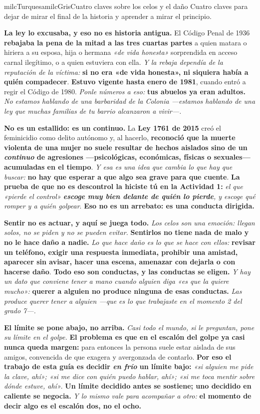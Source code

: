 \documentclass[11pt,letterpaper]{article}
\newcommand{\milcpaso}[3]{%
\Needspace{4\baselineskip}%
\begin{tcolorbox}[enhanced,colback=white,colframe=milcLinea,arc=1.5mm,boxrule=.9pt,
  left=14mm,right=4mm,top=3mm,bottom=3mm,before skip=4pt,after skip=4pt,
  fontupper=\RaggedRight,
  overlay={\node[anchor=north west,circle,fill=#2,text=white,inner sep=0pt,
    minimum size=7.4mm,font=\sffamily\bfseries\small]
    at ([xshift=3.6mm,yshift=-3.2mm]frame.north west) {#1};}]
#3
\end{tcolorbox}}
\begin{document}
\begin{softbox}{milcTurquesa}{milcGris}{Cuatro claves sobre los celos y el daño}
Cuatro claves para dejar de mirar el final de la historia y aprender a mirar el principio.
\end{softbox}

\milcpaso{1}{milcTurquesa}{\textbf{La ley lo excusaba, y eso no es historia antigua.} El Código Penal de 1936 \textbf{rebajaba la pena de la mitad a las tres cuartas partes} a quien matara o hiriera a su esposa, hija o hermana \emph{«de vida honesta»} sorprendida en acceso carnal ilegítimo, o a quien estuviera con ella. \emph{Y la rebaja dependía de la reputación de la víctima:} \textbf{si no era «de vida honesta», ni siquiera había a quién compadecer}. \textbf{Estuvo vigente hasta enero de 1981}, cuando entró a regir el Código de 1980. \emph{Ponle números a eso:} \textbf{tus abuelos ya eran adultos.} \emph{No estamos hablando de una barbaridad de la Colonia ---estamos hablando de una ley que muchas familias de tu barrio alcanzaron a vivir---.}}
\milcpaso{2}{milcTurquesa}{\textbf{No es un estallido: es un continuo.} La \textbf{Ley 1761 de 2015} creó el feminicidio como delito autónomo y, al hacerlo, \textbf{reconoció que la muerte violenta de una mujer no suele resultar de hechos aislados sino de un \emph{continuo} de agresiones ---psicológicas, económicas, físicas o sexuales--- acumuladas en el tiempo}. \emph{Y esa es una idea que cambia lo que hay que buscar:} \textbf{no hay que esperar a que algo sea grave para que cuente}. \textbf{La prueba de que no es descontrol la hiciste tú en la Actividad 1:} \emph{el que «pierde el control» \textbf{escoge muy bien delante de quién lo pierde}, y escoge qué romper y a quién golpear}. \textbf{Eso no es un arrebato: es una conducta dirigida.}}
\milcpaso{3}{milcTurquesa}{\textbf{Sentir no es actuar, y aquí se juega todo.} \emph{Los celos son una emoción: llegan solos, no se piden y no se pueden evitar.} \textbf{Sentirlos no tiene nada de malo y no le hace daño a nadie.} \emph{Lo que hace daño es lo que se hace con ellos:} \textbf{revisar un teléfono, exigir una respuesta inmediata, prohibir una amistad, aparecer sin avisar, hacer una escena, amenazar con dejarla o con hacerse daño}. \textbf{Todo eso son conductas, y las conductas se eligen.} \emph{Y hay un dato que conviene tener a mano cuando alguien diga «es que la quiere mucho»:} \textbf{querer a alguien no produce ninguna de esas conductas.} \emph{Las produce querer \emph{tener} a alguien ---que es lo que trabajaste en el momento 2 del grado 7---.}}
\milcpaso{4}{milcTurquesa}{\textbf{El límite se pone abajo, no arriba.} \emph{Casi todo el mundo, si le preguntan, pone su límite en el golpe.} \textbf{El problema es que en el escalón del golpe ya casi nunca queda margen:} para entonces la persona suele estar aislada de sus amigos, convencida de que exagera y avergonzada de contarlo. \textbf{Por eso el trabajo de esta guía es decidir \emph{en frío} un límite bajo:} \emph{«si alguien me pide la clave, ahí»; «si me dice con quién puedo hablar, ahí»; «si me toca mentir sobre dónde estuve, ahí»}. \textbf{Un límite decidido antes se sostiene; uno decidido en caliente se negocia.} \emph{Y lo mismo vale para acompañar a otro:} \textbf{el momento de decir algo es el escalón dos, no el ocho.}}
\end{document}

